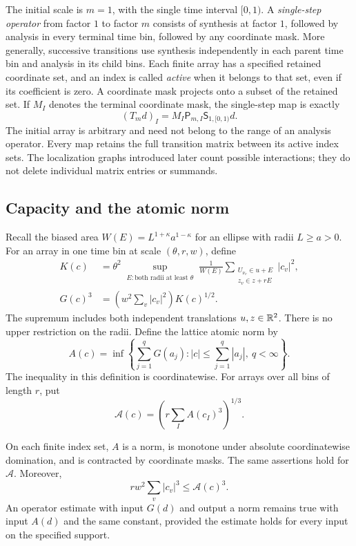 The initial scale is $m=1$, with the single time interval $[0,1)$.
A \emph{single-step operator} from factor $1$ to factor $m$ consists of
synthesis at factor $1$, followed by analysis in every terminal time
bin, followed by any coordinate mask.  More generally, successive
transitions use synthesis independently in each parent time bin and
analysis in its child bins.  Each finite array has a specified retained
coordinate set, and an index is called \emph{active} when it belongs to
that set, even if its coefficient is zero.  A coordinate mask projects
onto a subset of the retained set.  If \(M_I\) denotes the terminal
coordinate mask, the single-step map is exactly
\[
 (T_m d)_I=M_I\mathsf P_{m,I}\mathsf S_{1,[0,1)}d.
\]
The initial array is arbitrary and need not belong to the range of an
analysis operator.  Every map retains the full transition matrix
between its active index sets.  The localization graphs introduced
later count possible interactions; they do not delete individual
matrix entries or summands.

\subsection{Capacity and the atomic norm}

Recall the biased area
$W(E)=L^{1+\kappa}a^{1-\kappa}$ for an ellipse with radii $L\ge a>0$.
For an array in one time bin at scale $(\theta,r,w)$, define
\begin{equation}\label{eq:source-29}
 \begin{split}
 K(c)&=\theta^2
   \sup_{\substack{E:\text{both radii at least }\theta}}
   \frac{1}{W(E)}
   \sum_{\substack{U_{\nu_v}\in u+E\\ z_v\in z+rE}}|c_v|^2,
       \\
 G(c)^3&=\left(w^2\sum_v|c_v|^2\right)K(c)^{1/2}.
 \end{split}
\end{equation}
The supremum includes both independent translations $u,z\in\mathbb R^2$.
There is no upper restriction on the radii.  Define the lattice atomic
norm by
\[
 A(c)=\inf\left\{\sum_{j=1}^qG(a_j):
          |c|\le\sum_{j=1}^q|a_j|,\ q<\infty\right\}.
\]
The inequality in this definition is coordinatewise.  For arrays over
all bins of length $r$, put
\begin{equation}\label{pkt:combined-norm}
 \mathcal A(c)=\left(r\sum_I A(c_I)^3\right)^{1/3}.
\end{equation}

\begin{lemma}\label{pkt:atomic}
On each finite index set, $A$ is a norm, is monotone under absolute
coordinatewise domination, and is contracted by coordinate masks.
The same assertions hold for $\mathcal A$.  Moreover,
\begin{equation}\label{eq:source-30}
 r w^2\sum_v|c_v|^3\le\mathcal A(c)^3.
\end{equation}
An operator estimate with input $G(d)$ and output a norm remains true
with input $A(d)$ and the same constant, provided the estimate holds
for every input on the specified support.
\end{lemma}

